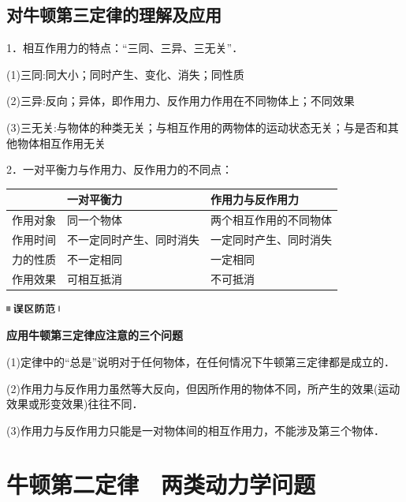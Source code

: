 \documentclass[cn,10.5pt,chinese,mac,chinesefont=founder]{elegantbook}
\begin{document}
\subsection{对牛顿第三定律的理解及应用}

1．相互作用力的特点：``三同、三异、三无关''．

(1)三同:同大小；同时产生、变化、消失；同性质

(2)三异:反向；异体，即作用力、反作用力作用在不同物体上；不同效果

(3)三无关:与物体的种类无关；与相互作用的两物体的运动状态无关；与是否和其他物体相互作用无关

2．一对平衡力与作用力、反作用力的不同点：

\begin{longtable}[]{@{}lll@{}}
\toprule


  & \begin{minipage}[b]{0.30\columnwidth}\raggedright
一对平衡力\strut
\end{minipage} & \begin{minipage}[b]{0.30\columnwidth}\raggedright
作用力与反作用力\strut
\end{minipage}\tabularnewline
\midrule
\endhead
作用对象 & 同一个物体 & 两个相互作用的不同物体\tabularnewline
作用时间 & 不一定同时产生、同时消失 &
一定同时产生、同时消失\tabularnewline
力的性质 & 不一定相同 & 一定相同\tabularnewline
作用效果 & 可相互抵消 & 不可抵消\tabularnewline
\bottomrule
\end{longtable}



\begin{center}\includegraphics[width=0.70833in,height=0.125in]{media/image34.png}

\textbf{应用牛顿第三定律应注意的三个问题}
\end{center}


(1)定律中的``总是''说明对于任何物体，在任何情况下牛顿第三定律都是成立的．

(2)作用力与反作用力虽然等大反向，但因所作用的物体不同，所产生的效果(运动效果或形变效果)往往不同．

(3)作用力与反作用力只能是一对物体间的相互作用力，不能涉及第三个物体．
\newpage
\section{牛顿第二定律　两类动力学问题}
\end{document}
